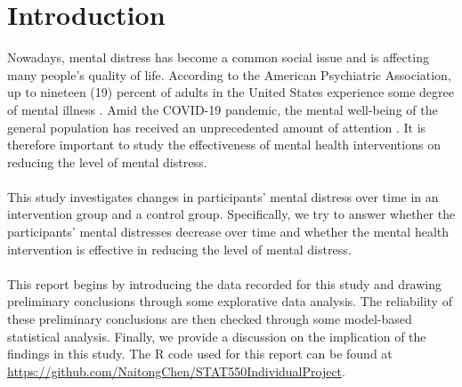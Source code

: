 

\section{Introduction}\label{sec:introduction}
Nowadays, mental distress has become a common social issue and is affecting many people's quality of life. According to the American Psychiatric Association, up to nineteen (19) percent of adults in the United States experience some degree of mental illness \cite{apastat}. Amid the COVID-19 pandemic, the mental well-being of the general population has received an unprecedented amount of attention \cite{twenge2020mental}. It is therefore important to study the effectiveness of mental health interventions on reducing the level of mental distress.\\\\
This study investigates changes in participants' mental distress over time in an intervention group and a control group. Specifically, we try to answer whether the participants' mental distresses decrease over time and whether the mental health intervention is effective in reducing the level of mental distress.\\\\
This report begins by introducing the data recorded for this study and drawing preliminary conclusions through some explorative data analysis. The reliability of these preliminary conclusions are then checked through some model-based statistical analysis. Finally, we provide a discussion on the implication of the findings in this study. The R code used for this report can be found at \url{https://github.com/NaitongChen/STAT550IndividualProject}.
